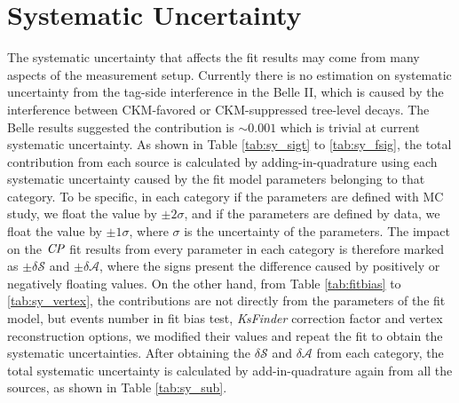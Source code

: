 \section{Systematic Uncertainty}
The systematic uncertainty that affects the fit results may come from many aspects of the measurement setup. Currently there is no estimation on systematic uncertainty from the tag-side interference in the Belle II, which is caused by the interference between CKM-favored or CKM-suppressed tree-level decays. The Belle results suggested the contribution is $\sim 0.001$\cite{yosuke2011measurement} which is trivial at current systematic uncertainty. As shown in Table \ref{tab:sy_sigt} to \ref{tab:sy_fsig}, the total contribution from each source is calculated by adding-in-quadrature using each systematic uncertainty caused by the fit model parameters belonging to that category. To be specific, in each category if the parameters are defined with MC study, we float the value by $\pm 2 \sigma$, and if the parameters are defined by data, we float the value by $\pm 1 \sigma$, where $\sigma$ is the uncertainty of the parameters. The impact on the $\it{CP}$ fit results from every parameter in each category is therefore marked as $\pm \delta \mathcal{S}$ and $\pm \delta \mathcal{A}$, where the signs present the difference caused by positively or negatively floating values. On the other hand, from Table \ref{tab:fitbias} to \ref{tab:sy_vertex}, the contributions are not directly from the parameters of the fit model, but events number in fit bias test, \textit{KsFinder} correction factor and vertex reconstruction options, we modified their values and repeat the fit to obtain the systematic uncertainties. After obtaining the $\delta \mathcal{S}$ and $\delta \mathcal{A}$ from each category, the total systematic uncertainty is calculated by add-in-quadrature again from all the sources, as shown in Table \ref{tab:sy_sub}.

